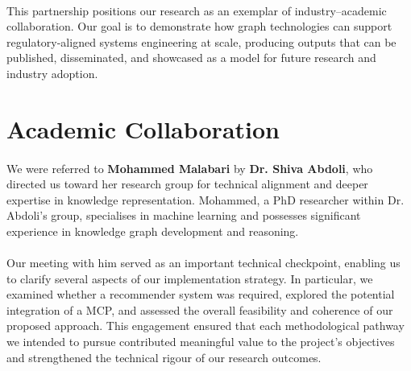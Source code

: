         \paragraph{} This partnership positions our research as an exemplar of industry–academic collaboration. Our goal is to demonstrate how graph technologies can support regulatory-aligned systems engineering at scale, producing outputs that can be published, disseminated, and showcased as a model for future research and industry adoption.

    \section{Academic Collaboration}

        \paragraph{} We were referred to \textbf{Mohammed Malabari} by \textbf{Dr. Shiva Abdoli}, who directed us toward her research group for technical alignment and deeper expertise in knowledge representation. Mohammed, a PhD researcher within Dr. Abdoli’s group, specialises in machine learning and possesses significant experience in knowledge graph development and reasoning.
        
        \paragraph{} Our meeting with him served as an important technical checkpoint, enabling us to clarify several aspects of our implementation strategy. In particular, we examined whether a recommender system was required, explored the potential integration of a MCP, and assessed the overall feasibility and coherence of our proposed approach. This engagement ensured that each methodological pathway we intended to pursue contributed meaningful value to the project’s objectives and strengthened the technical rigour of our research outcomes.